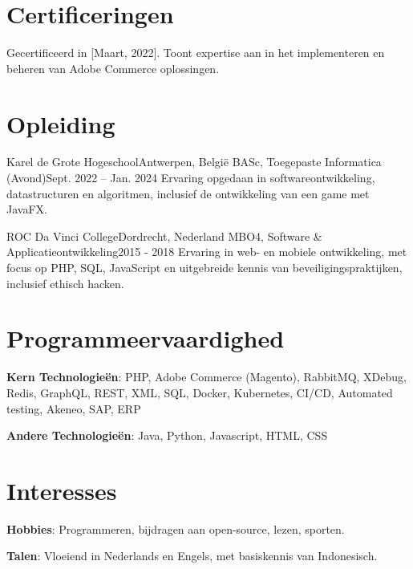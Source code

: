   \resumeSubHeadingListEnd

\section{Certificeringen}
  \resumeSubHeadingListStart
      {Gecertificeerd in [Maart, 2022]. Toont expertise aan in het implementeren en beheren van Adobe Commerce oplossingen.}
  \resumeSubHeadingListEnd

\section{Opleiding}
  \resumeSubHeadingListStart
    \resumeSubheading
      {Karel de Grote Hogeschool}{Antwerpen, België}
      {BASc, Toegepaste Informatica (Avond)}{Sept. 2022 -- Jan. 2024}
      \resumeItemListStart
          {Ervaring opgedaan in softwareontwikkeling, datastructuren en algoritmen, inclusief de ontwikkeling van een game met JavaFX.}
      \resumeItemListEnd
      
    \resumeSubheading
      {ROC Da Vinci College}{Dordrecht, Nederland}
      {MBO4, Software \& Applicatieontwikkeling}{2015 - 2018}
      \resumeItemListStart
          {Ervaring in web- en mobiele ontwikkeling, met focus op PHP, SQL, JavaScript en uitgebreide kennis van beveiligingspraktijken, inclusief ethisch hacken.}
      \resumeItemListEnd
  \resumeSubHeadingListEnd

\section{Programmeervaardighed}
 \resumeSubHeadingListStart
   \item{
     \textbf{Kern Technologieën}{: PHP, Adobe Commerce (Magento), RabbitMQ, XDebug, Redis, GraphQL, REST, XML, SQL, Docker, Kubernetes, CI/CD, Automated testing, Akeneo, SAP, ERP}
   }
   \item{
     \textbf{Andere Technologieën}{: Java, Python, Javascript, HTML, CSS}
   }
 \resumeSubHeadingListEnd

\section{Interesses}
 \resumeSubHeadingListStart
   \item{
     \textbf{Hobbies}{: Programmeren, bijdragen aan open-source, lezen, sporten.}
   }
   \item{
     \textbf{Talen}{: Vloeiend in Nederlands en Engels, met basiskennis van Indonesisch.}
   }
 \resumeSubHeadingListEnd